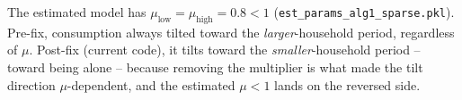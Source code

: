\documentclass[11pt]{article}
\begin{document}
The estimated model has $\mu_{\text{low}} = \mu_{\text{high}} = 0.8 < 1$
(\texttt{est\_params\_alg1\_sparse.pkl}). Pre-fix, consumption always tilted
toward the \emph{larger}-household period, regardless of $\mu$. Post-fix
(current code), it tilts toward the \emph{smaller}-household period --
toward being alone -- because removing the multiplier is what made the
tilt direction $\mu$-dependent, and the estimated $\mu<1$ lands on the
reversed side.
\end{document}
